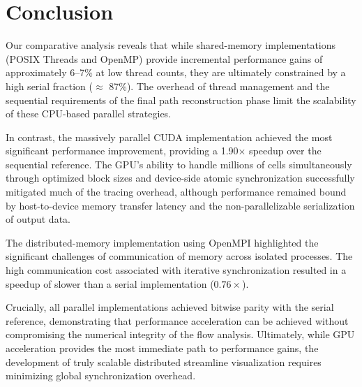 \section{Conclusion}

Our comparative analysis reveals that while shared-memory implementations (POSIX Threads and OpenMP) provide incremental performance gains of approximately 6--7\% at low thread counts, they are ultimately constrained by a high serial fraction ($\approx$ 87\%).
The overhead of thread management and the sequential requirements of the final path reconstruction phase limit the scalability of these CPU-based parallel strategies.

In contrast, the massively parallel CUDA implementation achieved the most significant performance improvement, providing a 1.90$\times$ speedup over the sequential reference.
The GPU's ability to handle millions of cells simultaneously through optimized block sizes and device-side atomic synchronization successfully mitigated much of the tracing overhead, although performance remained bound by host-to-device memory transfer latency and the non-parallelizable serialization of output data.

The distributed-memory implementation using OpenMPI highlighted the significant challenges of communication of memory across isolated processes.
The high communication cost associated with iterative synchronization resulted in a speedup of slower than a serial implementation ($0.76\times$).

Crucially, all parallel implementations achieved bitwise parity with the serial reference, demonstrating that  performance acceleration can be achieved without compromising the numerical integrity of the flow analysis.
Ultimately, while GPU acceleration provides the most immediate path to performance gains, the development of truly scalable distributed streamline visualization requires minimizing global synchronization overhead.
